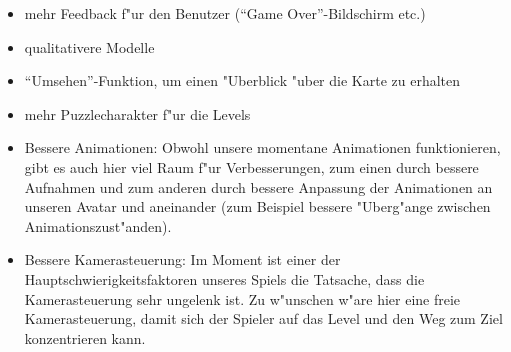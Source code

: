 \begin{itemize}
	\item
		mehr Feedback f"ur den Benutzer (``Game Over''-Bildschirm etc.)
	\item
		qualitativere Modelle
	\item
		``Umsehen''-Funktion, um einen "Uberblick "uber die Karte
		zu erhalten
	\item
		mehr Puzzlecharakter f"ur die Levels
	\item Bessere Animationen: Obwohl unsere momentane Animationen funktionieren, gibt es auch hier viel
		Raum f"ur Verbesserungen, zum einen durch bessere Aufnahmen und zum anderen durch bessere Anpassung
		der Animationen an unseren Avatar und aneinander (zum Beispiel bessere "Uberg"ange zwischen
		Animationszust"anden).
	\item Bessere Kamerasteuerung: Im Moment ist einer der Hauptschwierigkeitsfaktoren unseres Spiels die
		Tatsache, dass die Kamerasteuerung sehr ungelenk ist. Zu w"unschen w"are hier eine freie Kamerasteuerung,
		damit sich der Spieler auf das Level und den Weg zum Ziel konzentrieren kann.
\end{itemize}
